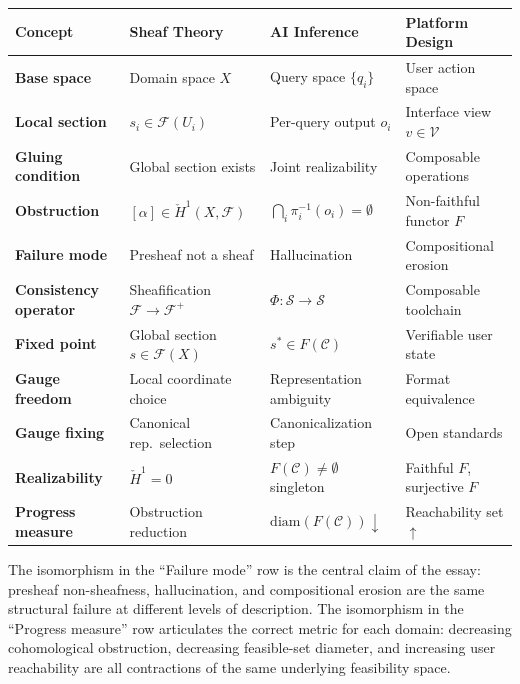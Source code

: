 \documentclass[12pt, oneside]{article}
\begin{document}
\bigskip

\renewcommand{\arraystretch}{1.6}
\begin{tabular}{>{\bfseries}p{3.2cm} p{3.8cm} p{3.8cm} p{3.5cm}}
\toprule
Concept & Sheaf Theory & AI Inference & Platform Design \\
\midrule
Base space & Domain space $X$ & Query space $\{q_i\}$ & User action space \\
Local section & $s_i \in \mathcal{F}(U_i)$ & Per-query output $o_i$ & Interface view $v \in \mathcal{V}$ \\
Gluing condition & Global section exists & Joint realizability & Composable operations \\
Obstruction & $[\alpha] \in \check{H}^1(X, \mathcal{F})$ & $\bigcap_i \pi_i^{-1}(o_i) = \emptyset$ & Non-faithful functor $F$ \\
Failure mode & Presheaf not a sheaf & Hallucination & Compositional erosion \\
Consistency operator & Sheafification $\mathcal{F} \to \mathcal{F}^+$ & $\Phi : \mathcal{S} \to \mathcal{S}$ & Composable toolchain \\
Fixed point & Global section $s \in \mathcal{F}(X)$ & $s^* \in F(\mathcal{C})$ & Verifiable user state \\
Gauge freedom & Local coordinate choice & Representation ambiguity & Format equivalence \\
Gauge fixing & Canonical rep.\ selection & Canonicalization step & Open standards \\
Realizability & $\check{H}^1 = 0$ & $F(\mathcal{C}) \neq \emptyset$ singleton & Faithful $F$, surjective $F$ \\
Progress measure & Obstruction reduction & $\mathrm{diam}(F(\mathcal{C})) \downarrow$ & Reachability set $\uparrow$ \\
\bottomrule
\end{tabular}

\bigskip

The isomorphism in the ``Failure mode'' row is the central claim of the essay: presheaf non-sheafness, hallucination, and compositional erosion are the same structural failure at different levels of description. The isomorphism in the ``Progress measure'' row articulates the correct metric for each domain: decreasing cohomological obstruction, decreasing feasible-set diameter, and increasing user reachability are all contractions of the same underlying feasibility space.
\end{document}
